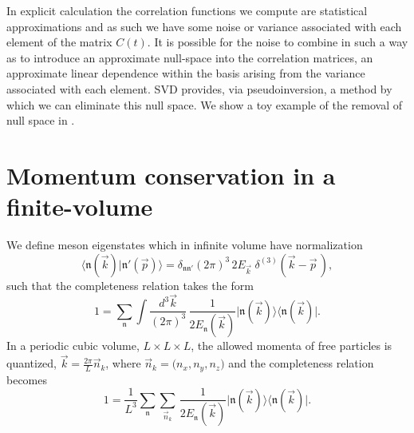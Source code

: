 In explicit calculation the correlation functions we compute are statistical approximations and as such we have some noise or variance associated with each element of the matrix $C(t)$. It is possible for the noise to combine in such a way as to introduce an approximate null-space into the correlation matrices, an approximate linear dependence within the basis arising from the variance associated with each element. SVD provides, via pseudoinversion, a method by which we can eliminate this null space. We show a toy example of the removal of null space in .




\section{Momentum conservation in a finite-volume}\label{app::two-point}

We define meson eigenstates which in infinite volume have normalization
\begin{equation}
 \big\langle \mathfrak{n}(\vec{k}) \big| \mathfrak{n}'(\vec{p}) \big\rangle = \delta_{\mathfrak{n}\mathfrak{n}'}(2\pi)^3 \, 2 E_{\vec{k}} \; \delta^{(3)}( \vec{k} - \vec{p} \,),
\end{equation}
such that the completeness relation takes the form
\begin{equation}
1 = \sum_\mathfrak{n} \int \!\! \frac{d^3 \vec{k} }{(2\pi)^3} \, \frac{1}{2  E_{\mathfrak{n}}(\vec{k})  } 
	\big| \mathfrak{n}(\vec{k}) \big\rangle \big\langle \mathfrak{n}(\vec{k}) \big|.
\end{equation}
In a periodic cubic volume, $L \times L \times L$, the allowed momenta of free particles is quantized, $\vec{k} = \tfrac{2\pi}{L} \vec{n}_k$, where $\vec{n}_k = \big(n_x, n_y, n_z \big)$ and the completeness relation becomes
\begin{equation}
1 = \frac{1}{L^3} \sum_\mathfrak{n} \sum_{\vec{n}_k} \, \frac{1}{2 E_{\mathfrak{n}}(\vec{k}) } 
	\big| \mathfrak{n}(\vec{k}) \big\rangle \big\langle \mathfrak{n}(\vec{k}) \big|. \label{completeness}
\end{equation}


